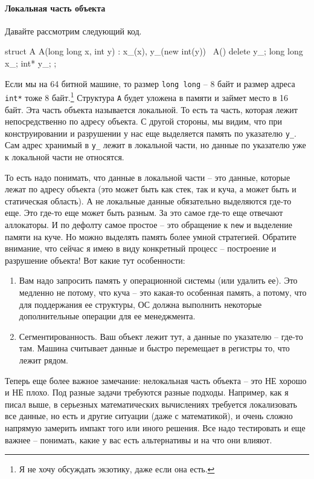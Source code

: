 \documentclass{article}
\begin{document}
\paragraph{Локальная часть объекта}
Давайте рассмотрим следующий код.
\begin{cppcode}
struct A{
  A(long long x, int y) : x_(x), y_(new int(y)){
  }
  ~A() {
    delete y_;
  }
  long long x_;
  int* y_;
};
\end{cppcode}
Если мы на 64 битной машине, то размер \verb"long long" -- 8 байт и размер адреса \verb"int*" тоже 8 байт.\footnote{Я не хочу обсуждать экзотику, даже если она есть.} Структура \verb"A" будет уложена в памяти и займет место в 16 байт. Эта часть объекта называется локальной. То есть та часть, которая лежит непосредственно по адресу объекта. С другой стороны, мы видим, что при конструировании и разрушении у нас еще выделяется память по указателю \verb"y_". Сам адрес хранимый в \verb"y_" лежит в локальной части, но данные по указателю уже к локальной части не относятся.

То есть надо понимать, что данные в локальной части -- это данные, которые лежат по адресу объекта (это может быть как стек, так и куча, а может быть и статическая область). А не локальные данные обязательно выделяются где-то еще. Это где-то еще может быть разным. За это самое где-то еще отвечают аллокаторы. И по дефолту самое простое -- это обращение к \verb"new" и выделение памяти на куче. Но можно выделять память более умной стратегией. Обратите внимание, что сейчас я имею в виду конкретный процесс -- построение и разрушение объекта! Вот какие тут особенности:
\begin{enumerate}
\item Вам надо запросить память у операционной системы (или удалить ее). Это медленно не потому, что куча -- это какая-то особенная память, а потому, что для поддержания ее структуры, ОС должна выполнить некоторые дополнительные операции для ее менеджмента.
\item Сегментированность. Ваш объект лежит тут, а данные по указателю -- где-то там. Машина считывает данные и быстро перемещает в регистры то, что лежит рядом.
\end{enumerate}
Теперь еще более важное замечание: нелокальная часть объекта -- это НЕ хорошо и НЕ плохо. Под разные задачи требуются разные подходы. Например, как я писал выше, в серьезных математических вычислениях требуется локализовать все данные, но есть и другие ситуации (даже с математикой), и очень сложно напрямую замерить импакт того или иного решения. Все надо тестировать и еще важнее -- понимать, какие у вас есть альтернативы и на что они влияют.
\end{document}

